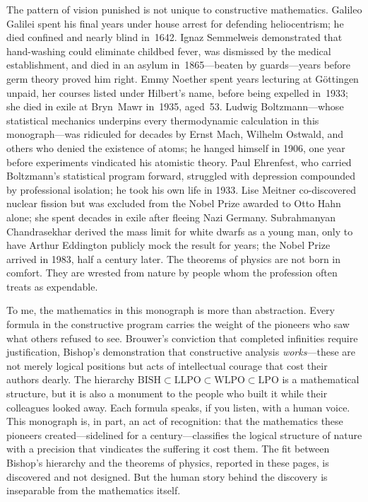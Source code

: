 \documentclass[11pt,a4paper]{report}
\theoremstyle{plain}
\theoremstyle{definition}
\theoremstyle{remark}
\newcommand{\BISH}{\mathrm{BISH}}
\newcommand{\LLPO}{\mathrm{LLPO}}
\newcommand{\WLPO}{\mathrm{WLPO}}
\newcommand{\LPO}{\mathrm{LPO}}
\begin{document}
The pattern of vision punished is not unique to constructive mathematics. Galileo Galilei spent his final years under house arrest for defending heliocentrism; he died confined and nearly blind in~1642. Ignaz Semmelweis demonstrated that hand-washing could eliminate childbed fever, was dismissed by the medical establishment, and died in an asylum in~1865---beaten by guards---years before germ theory proved him right. Emmy Noether spent years lecturing at G\"ottingen unpaid, her courses listed under Hilbert's name, before being expelled in~1933; she died in exile at Bryn~Mawr in~1935, aged~53. Ludwig Boltzmann---whose statistical mechanics underpins every thermodynamic calculation in this monograph---was ridiculed for decades by Ernst Mach, Wilhelm Ostwald, and others who denied the existence of atoms; he hanged himself in 1906, one year before experiments vindicated his atomistic theory. Paul Ehrenfest, who carried Boltzmann's statistical program forward, struggled with depression compounded by professional isolation; he took his own life in 1933. Lise Meitner co-discovered nuclear fission but was excluded from the Nobel Prize awarded to Otto Hahn alone; she spent decades in exile after fleeing Nazi Germany. Subrahmanyan Chandrasekhar derived the mass limit for white dwarfs as a young man, only to have Arthur Eddington publicly mock the result for years; the Nobel Prize arrived in 1983, half a century later. The theorems of physics are not born in comfort. They are wrested from nature by people whom the profession often treats as expendable.

To me, the mathematics in this monograph is more than abstraction. Every formula in the constructive program carries the weight of the pioneers who saw what others refused to see. Brouwer's conviction that completed infinities require justification, Bishop's demonstration that constructive analysis \emph{works}---these are not merely logical positions but acts of intellectual courage that cost their authors dearly. The hierarchy $\BISH \subset \LLPO \subset \WLPO \subset \LPO$ is a mathematical structure, but it is also a monument to the people who built it while their colleagues looked away. Each formula speaks, if you listen, with a human voice. This monograph is, in part, an act of recognition: that the mathematics these pioneers created---sidelined for a century---classifies the logical structure of nature with a precision that vindicates the suffering it cost them. The fit between Bishop's hierarchy and the theorems of physics, reported in these pages, is discovered and not designed. But the human story behind the discovery is inseparable from the mathematics itself.
\end{document}
